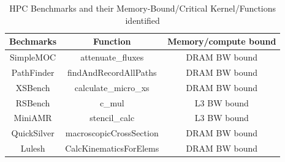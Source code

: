 %
%
\begin{table}[b]
\small
\caption{HPC Benchmarks and their Memory-Bound/Critical Kernel/Functions identified}
\centering
    \begin{tabularx}{\columnwidth}{ccc}
\toprule
    Bechmarks & Function & Memory/compute bound \\
\midrule

SimpleMOC & attenuate\_fluxes & DRAM BW bound \\
PathFinder   & findAndRecordAllPaths & DRAM BW bound \\
XSBench      & calculate\_micro\_xs & DRAM BW bound \\
RSBench      & c_mul & L3 BW bound \\
MiniAMR      & stencil\_calc & L3 BW bound \\
QuickSilver      & macroscopicCrossSection & DRAM BW bound \\
Lulesh & CalcKinematicsForElems & DRAM BW bound \\
\bottomrule
   \end{tabularx}
\label{table:apps}
\end{table}
%
%
%












